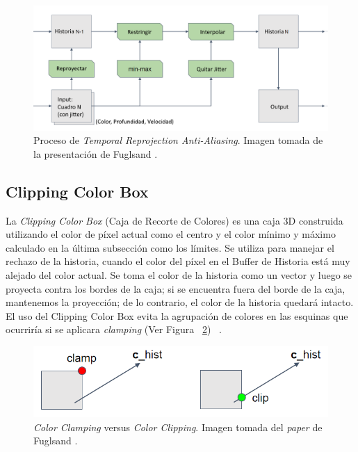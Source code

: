\documentclass[pregrado]{tesis-usb} %
\begin{document}
\begin{figure}[H]
	\centering
	\includegraphics[scale=0.4]{images/sampling_process.png}
	\caption{Proceso de \textit{Temporal Reprojection Anti-Aliasing}. Imagen tomada de la presentación de Fuglsand \protect\cite{Fuglsand2016}.}\label{fig:samplingprocess}
\end{figure}

\subsection{Clipping Color Box} 
La \textit{Clipping Color Box} (Caja de Recorte de Colores) es una caja 3D construida utilizando el color de píxel actual como el centro y el color mínimo y máximo calculado en la última subsección como los límites. Se utiliza para manejar el rechazo de la historia, cuando el color del píxel en el Buffer de Historia está muy alejado del color actual. Se toma el color de la historia como un vector y luego se proyecta contra los bordes de la caja; si se encuentra fuera del borde de la caja, mantenemos la proyección; de lo contrario, el color de la historia quedará intacto. El uso del Clipping Color Box evita la agrupación de colores en las esquinas que ocurriría si se aplicara \textit{clamping} (Ver Figura ~\ref{fig:clippingbox}) ~\cite{Fuglsand2016}.

\begin{figure}[!hbt]
	\centering
	\includegraphics[scale=0.4]{images/clipping_box.png}
	\caption{\textit{Color Clamping} versus \textit{Color Clipping}. Imagen tomada del \textit{paper} de Fuglsand \protect\cite{Fuglsand2016}.}\label{fig:clippingbox}
\end{figure}
\end{document}

